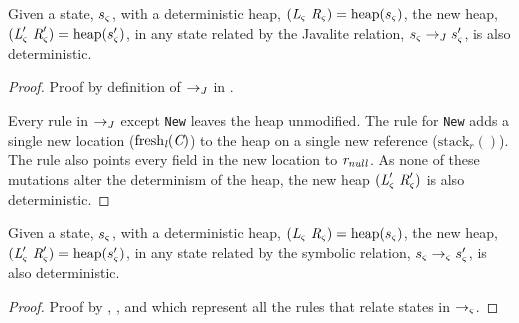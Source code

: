 \begin{lemma}
\label{lem:J-determ}
Given a state, $s_{\varsigma}$, with a deterministic heap,
$(\emph{L}_{\varsigma}\ \emph{R}_{\varsigma}) =
\mathrm{heap}(s_{\varsigma})$, the new heap,
$(\emph{L}_{\varsigma}^\prime\ \emph{R}_{\varsigma}^\prime) =
\mathrm{heap}(s_{\varsigma}^\prime)$, in any state related by the
Javalite relation, $s_{\varsigma} \rightarrow_{J} s_{\varsigma}^\prime$, is
also deterministic.
\end{lemma}
\begin{proof}
Proof by definition of $\rightarrow_{J}$ in .

Every rule in $\rightarrow_{J}$ except \texttt{New} leaves the heap
unmodified. The rule for \texttt{New} adds a single new location
($\mathrm{fresh}_{\emph{l}}(\emph{C})$) to the heap on a single new
reference ($\mathrm{stack}_r()$). The rule also points every field in
the new location to $\emph{r}_\mathit{null}$. As none of these
mutations alter the determinism of the heap, the new heap
$(\cfgnt{L}_\sym^\prime\ \cfgnt{R}_\sym^\prime)$ is also
deterministic.
\end{proof}

\begin{theorem}
\label{thm:determ}
Given a state, $s_{\varsigma}$, with a deterministic heap,
$(\emph{L}_{\varsigma}\ \emph{R}_{\varsigma}) =
\mathrm{heap}(s_{\varsigma})$, the new heap,
$(\emph{L}_{\varsigma}^\prime\ \emph{R}_{\varsigma}^\prime) =
\mathrm{heap}(s_{\varsigma}^\prime)$, in any state related by the
symbolic relation, $s_{\varsigma} \rightarrow_{\varsigma} s_{\varsigma}^\prime$, is
also deterministic.
\end{theorem}
\begin{proof}
Proof by , , and 
which represent all the rules that relate states in
$\rightarrow_{\varsigma}$.
\end{proof}



